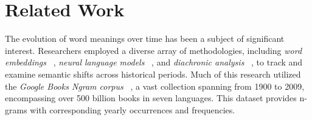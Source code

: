 
\section{Related Work} \label{sec:relatedwork}
The evolution of word meanings over time has been a subject of significant interest.
Researchers employed a diverse array of methodologies, including \emph{word embeddings} ~\cite{kulkarni2014statisticallysignificantdetectionlinguistic},
\emph{neural language models} ~\cite{kim-etal-2014-temporal}, and \emph{diachronic analysis} ~\cite{hamilton-etal-2016-diachronic, kutuzov-etal-2018-diachronic},
to track and examine semantic shifts across historical periods.
Much of this research utilized the \emph{Google Books Ngram corpus}
~\cite{gulordava-baroni-2011-distributional, kim-etal-2014-temporal, kulkarni2014statisticallysignificantdetectionlinguistic, 10.1007/978-3-319-50496-4_18, hamilton-etal-2016-cultural, hamilton-etal-2016-diachronic, kutuzov-etal-2018-diachronic},
a vast collection spanning from 1900 to 2009,
encompassing over 500 billion books in seven languages.
This dataset provides n-grams with corresponding yearly occurrences and frequencies.

